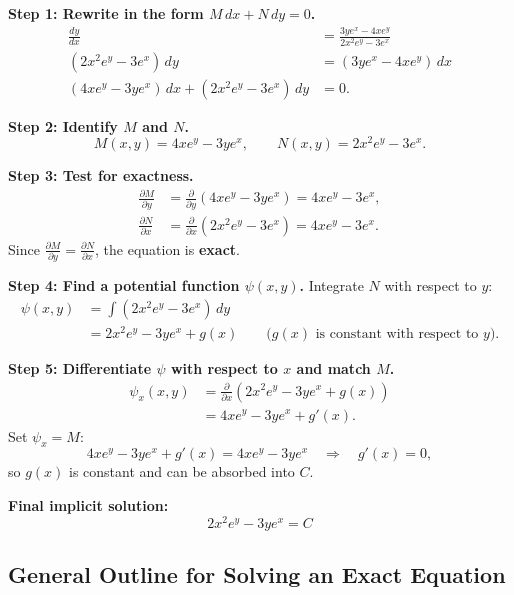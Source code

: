 \documentclass[11pt]{article}
\begin{document}
\medskip
\noindent\textbf{Step 1: Rewrite in the form $M\,dx+N\,dy=0$.}
\begin{align*}
\frac{dy}{dx} &= \frac{3ye^x-4xe^y}{2x^2e^y-3e^x} \\
\left(2x^2e^y-3e^x\right)\,dy &= \left(3ye^x-4xe^y\right)\,dx \\
\left(4xe^y-3ye^x\right)\,dx + \left(2x^2e^y-3e^x\right)\,dy &= 0.
\end{align*}

\noindent\textbf{Step 2: Identify $M$ and $N$.}
\[
M(x,y)=4xe^y-3ye^x,
\qquad
N(x,y)=2x^2e^y-3e^x.
\]

\noindent\textbf{Step 3: Test for exactness.}
\begin{align*}
\frac{\partial M}{\partial y} &= \frac{\partial}{\partial y}\left(4xe^y-3ye^x\right)=4xe^y-3e^x,\\
\frac{\partial N}{\partial x} &= \frac{\partial}{\partial x}\left(2x^2e^y-3e^x\right)=4xe^y-3e^x.
\end{align*}
\noindent Since $\frac{\partial M}{\partial y}=\frac{\partial N}{\partial x}$, the equation is \textbf{exact}.

\medskip
\noindent\textbf{Step 4: Find a potential function $\psi(x,y)$.}
Integrate $N$ with respect to $y$:
\begin{align*}
\psi(x,y) &= \int \left(2x^2e^y-3e^x\right)\,dy \\
          &= 2x^2e^y - 3ye^x + g(x)
          \qquad\text{($g(x)$ is constant with respect to $y$).}
\end{align*}

\noindent\textbf{Step 5: Differentiate $\psi$ with respect to $x$ and match $M$.}
\begin{align*}
\psi_x(x,y) &= \frac{\partial}{\partial x}\left(2x^2e^y - 3ye^x + g(x)\right) \\
            &= 4xe^y - 3ye^x + g'(x).
\end{align*}
Set $\psi_x = M$:
\[
4xe^y - 3ye^x + g'(x) = 4xe^y - 3ye^x
\quad\Longrightarrow\quad
g'(x)=0,
\]
so $g(x)$ is constant and can be absorbed into $C$.

\noindent\textbf{Final implicit solution:}
\[
\boxed{\;2x^2e^y - 3ye^x = C\;}
\]

\subsection{General Outline for Solving an Exact Equation}
\end{document}
